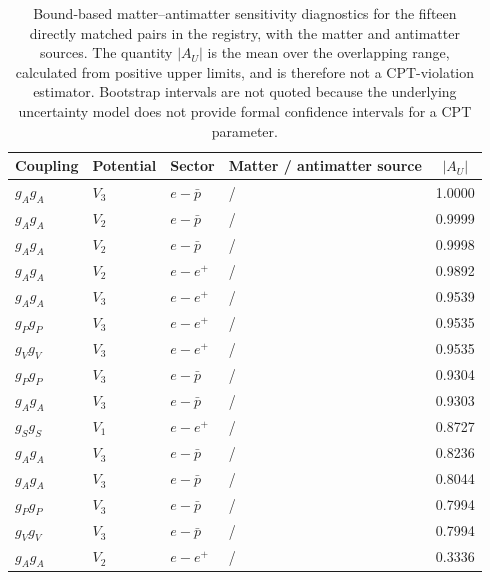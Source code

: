 \documentclass[aps,prd,reprint,superscriptaddress,nofootinbib]{revtex4-2}
\begin{document}
	\begin{table}[t]
		\caption{Bound-based matter--antimatter sensitivity diagnostics for the fifteen directly matched pairs in the registry, with the matter and antimatter sources. The quantity $|A_U|$ is the mean over the overlapping range, calculated from positive upper limits, and is therefore not a CPT-violation estimator. Bootstrap intervals are not quoted because the underlying uncertainty model does not provide formal confidence intervals for a CPT parameter.}
		\label{tab:asymmetry}
		\begin{ruledtabular}
			\begin{tabular}{llllc}
				Coupling & Potential & Sector & Matter / antimatter source & $|A_U|$ \\
				\hline
				$g_Ag_A$ & $V_3$ & $e-\bar p$ & \cite{Cong2025b} / \cite{Fadeev2022} & 1.0000\\
				$g_Ag_A$ & $V_2$ & $e-\bar p$ & \cite{Cong2025b} / \cite{Ficek2018} & 0.9999\\
				$g_Ag_A$ & $V_2$ & $e-\bar p$ & \cite{Karshenboim2011} / \cite{Ficek2018} & 0.9998\\
				$g_Ag_A$ & $V_2$ & $e-e^+$ & \cite{Ficek2017} / \cite{Karshenboim2011} & 0.9892\\
				$g_Ag_A$ & $V_3$ & $e-e^+$ & \cite{Ficek2017} / \cite{Fadeev2022} & 0.9539\\
				$g_Pg_P$ & $V_3$ & $e-e^+$ & \cite{Fadeev2022} / \cite{Fadeev2022} & 0.9535\\
				$g_Vg_V$ & $V_3$ & $e-e^+$ & \cite{Fadeev2022} / \cite{Fadeev2022} & 0.9535\\
				$g_Pg_P$ & $V_3$ & $e-\bar p$ & \cite{Cong2025b} / \cite{Ficek2018} & 0.9304\\
				$g_Ag_A$ & $V_3$ & $e-\bar p$ & \cite{Cong2025b} / \cite{Ficek2018} & 0.9303\\
				$g_Sg_S$ & $V_1$ & $e-e^+$ & \cite{Delaunay2017} / \cite{Adkins2022} & 0.8727\\
				$g_Ag_A$ & $V_3$ & $e-\bar p$ & \cite{Fadeev2022} / \cite{Ficek2018} & 0.8236\\
				$g_Ag_A$ & $V_3$ & $e-\bar p$ & \cite{Fadeev2022} / \cite{Fadeev2022} & 0.8044\\
				$g_Pg_P$ & $V_3$ & $e-\bar p$ & \cite{Fadeev2022} / \cite{Ficek2018} & 0.7994\\
				$g_Vg_V$ & $V_3$ & $e-\bar p$ & \cite{Fadeev2022} / \cite{Ficek2018} & 0.7994\\
				$g_Ag_A$ & $V_2$ & $e-e^+$ & \cite{Jiao2020} / \cite{Karshenboim2011} & 0.3336
			\end{tabular}
		\end{ruledtabular}
	\end{table}
	
\end{document}
